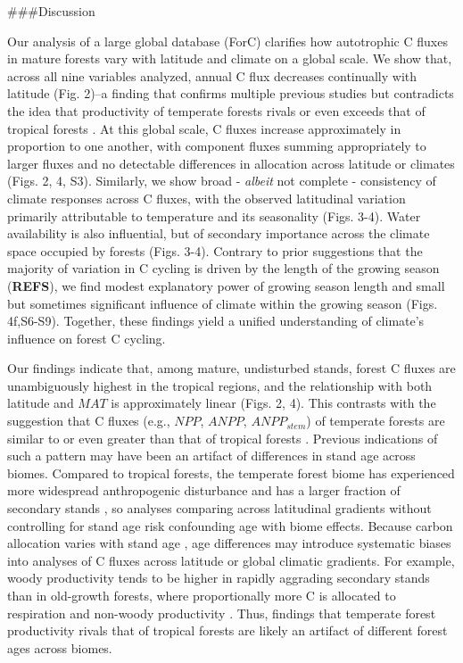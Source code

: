 \documentclass[
]{article}
\begin{document}
\#\#\#Discussion

Our analysis of a large global database (ForC) clarifies how autotrophic
C fluxes in mature forests vary with latitude and climate on a global
scale. We show that, across all nine variables analyzed, annual C flux
decreases continually with latitude (Fig. 2)--a finding that confirms
multiple previous studies but contradicts the idea that productivity of
temperate forests rivals or even exceeds that of tropical forests
\citep{luyssaert_co_2007, huston_global_2009}. At this global scale, C
fluxes increase approximately in proportion to one another, with
component fluxes summing appropriately to larger fluxes and no
detectable differences in allocation across latitude or climates (Figs.
2, 4, S3). Similarly, we show broad - \emph{albeit} not complete -
consistency of climate responses across C fluxes, with the observed
latitudinal variation primarily attributable to temperature and its
seasonality (Figs. 3-4). Water availability is also influential, but of
secondary importance across the climate space occupied by forests (Figs.
3-4). Contrary to prior suggestions that the majority of variation in C
cycling is driven by the length of the growing season (\textbf{REFS}),
we find modest explanatory power of growing season length and small but
sometimes significant influence of climate within the growing season
(Figs. 4f,S6-S9). Together, these findings yield a unified understanding
of climate's influence on forest C cycling.

Our findings indicate that, among mature, undisturbed stands, forest C
fluxes are unambiguously highest in the tropical regions, and the
relationship with both latitude and \(MAT\) is approximately linear
(Figs. 2, 4). This contrasts with the suggestion that C fluxes (e.g.,
\(NPP\), \(ANPP\), \(ANPP_{stem}\)) of temperate forests are similar to
or even greater than that of tropical forests
\citep{luyssaert_co_2007, huston_global_2009}. Previous indications of
such a pattern may have been an artifact of differences in stand age
across biomes. Compared to tropical forests, the temperate forest biome
has experienced more widespread anthropogenic disturbance and has a
larger fraction of secondary stands
\citep{potapov_mapping_2008, poulter_global_2018}, so analyses comparing
across latitudinal gradients without controlling for stand age risk
confounding age with biome effects. Because carbon allocation varies
with stand age
\citep{de_lucia_forest_2007, anderson-teixeira_altered_2013, doughty_what_2018},
age differences may introduce systematic biases into analyses of C
fluxes across latitude or global climatic gradients. For example, woody
productivity tends to be higher in rapidly aggrading secondary stands
than in old-growth forests, where proportionally more C is allocated to
respiration and non-woody productivity
\citep{de_lucia_forest_2007, piao_forest_2010, doughty_what_2018, kunert_understanding_2019}.
Thus, findings that temperate forest productivity rivals that of
tropical forests are likely an artifact of different forest ages across
biomes.
\end{document}
